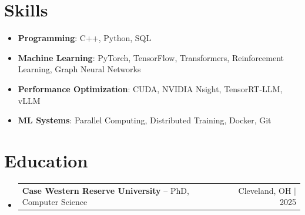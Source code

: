 \documentclass[letterpaper,13pt]{article}
\makeatletter
\newcommand{\resumeProjectHeading}[2]{
    \item
    \begin{tabular*}{\textwidth}{l@{\extracolsep{\fill}}r}
      \small#1 & #2 \\
    \end{tabular*}\vspace{-4pt}
}
\newcommand{\resumeSubHeadingListStart}{\begin{itemize}[leftmargin=0in, label={}]}
\newcommand{\resumeSubHeadingListEnd}{\end{itemize}}
\makeatother
\begin{document}
\section{Skills}
\vspace{0.02cm}
\begin{itemize}[leftmargin=0.15in, label={}, itemsep=2pt, topsep=1pt]
  \item \textbf{Programming}: C++, Python, SQL
  \item \textbf{Machine Learning}: PyTorch, TensorFlow, Transformers, Reinforcement Learning, Graph Neural Networks
  \item \textbf{Performance Optimization}: CUDA, NVIDIA Nsight, TensorRT-LLM, vLLM
  \item \textbf{ML Systems}: Parallel Computing, Distributed Training, Docker, Git
\end{itemize}
\vspace{0.02cm}

\section{Education}
\resumeSubHeadingListStart
  \resumeProjectHeading{\textbf{Case Western Reserve University} -- PhD, Computer Science}{Cleveland, OH $|$ 2025}
\resumeSubHeadingListEnd
\end{document}
